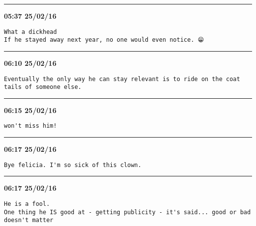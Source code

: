 \hrule%

\begin{adjustwidth}{0cm}{0cm}
\footnotesize \textbf{05:37 25/02/16}

\begin{lstlisting}[breaklines, breakatwhitespace, basicstyle=\small, frame=leftline]
What a dickhead 
If he stayed away next year, no one would even notice. 😁
\end{lstlisting}
\end{adjustwidth}

\hrule%

\begin{adjustwidth}{0cm}{0cm}
\footnotesize \textbf{06:10 25/02/16}

\begin{lstlisting}[breaklines, breakatwhitespace, basicstyle=\small, frame=leftline]
Eventually the only way he can stay relevant is to ride on the coat tails of someone else.
\end{lstlisting}
\end{adjustwidth}

\hrule%

\begin{adjustwidth}{0cm}{0cm}
\footnotesize \textbf{06:15 25/02/16}

\begin{lstlisting}[breaklines, breakatwhitespace, basicstyle=\small, frame=leftline]
won't miss him!
\end{lstlisting}
\end{adjustwidth}

\hrule%

\begin{adjustwidth}{0cm}{0cm}
\footnotesize \textbf{06:17 25/02/16}

\begin{lstlisting}[breaklines, breakatwhitespace, basicstyle=\small, frame=leftline]
Bye felicia. I'm so sick of this clown.
\end{lstlisting}
\end{adjustwidth}

\hrule%

\begin{adjustwidth}{0cm}{0cm}
\footnotesize \textbf{06:17 25/02/16}

\begin{lstlisting}[breaklines, breakatwhitespace, basicstyle=\small, frame=leftline]
He is a fool. 
One thing he IS good at - getting publicity - it's said... good or bad doesn't matter
\end{lstlisting}
\end{adjustwidth}

